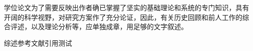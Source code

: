
\begin{review}
学位论文为了需要反映出作者确已掌握了坚实的基础理论和系统的专门知识，具有开阔的科学视野，对研究方案作了充分论证，因此，有关历史回顾和前人工作的综合评述，以及理论分析等，应单独成章，用足够的文字叙述。

综述参考文献引用测试
\cite{berger2013statistical,carpenter2022_game,feynman1972statistical}
\end{review}
